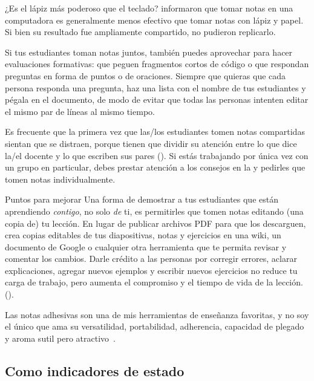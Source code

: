 \begin{aside}{¿Es el lápiz más poderoso que el teclado?}
  \cite{Muel2014} informaron que tomar notas en una computadora
  es generalmente menos efectivo que tomar notas con lápiz y papel.
  Si bien su resultado fue ampliamente compartido,
  \cite{More2019} no pudieron replicarlo.
\end{aside}

Si tus estudiantes toman notas juntos,
también puedes aprovechar para hacer evaluaciones formativas:
que peguen fragmentos cortos de código o
que respondan preguntas en forma de puntos o de oraciones.
Siempre que quieras que cada persona responda una pregunta,
haz una lista con el nombre de tus estudiantes y pégala en el documento,
de modo de evitar que todas las personas intenten editar el mismo par de líneas al mismo tiempo.

Es frecuente que la primera vez que las/los estudiantes tomen notas compartidas 
sientan que se distraen, porque tienen que dividir su atención entre
lo que dice la/el docente
y lo que escriben sus pares ().
Si estás trabajando por única vez con un grupo en particular,
debes prestar atención a los consejos en la 
y pedirles que tomen notas individualmente.

\begin{aside}{Puntos para mejorar}
  Una forma de demostrar a tus estudiantes que están aprendiendo \emph{contigo},
  no solo \emph{de} ti,
  es permitirles que tomen notas editando (una copia de) tu lección.
  En lugar de publicar archivos PDF para que los descarguen,
  crea copias editables de tus diapositivas, notas y ejercicios
  en una wiki,
  un documento de Google
  o cualquier otra herramienta que te permita revisar y comentar los cambios.
  Darle crédito a las personas por corregir errores,
  aclarar explicaciones,
  agregar nuevos ejemplos
  y escribir nuevos ejercicios no reduce tu carga de trabajo,
  pero aumenta el compromiso y el tiempo de vida de la lección.
  ().
\end{aside}


Las notas adhesivas son una de mis herramientas de enseñanza favoritas,
y no soy el único que ama su versatilidad,
portabilidad, adherencia, capacidad de plegado
y aroma sutil pero atractivo~\cite{Ward2015}.

\subsection*{Como indicadores de estado}

